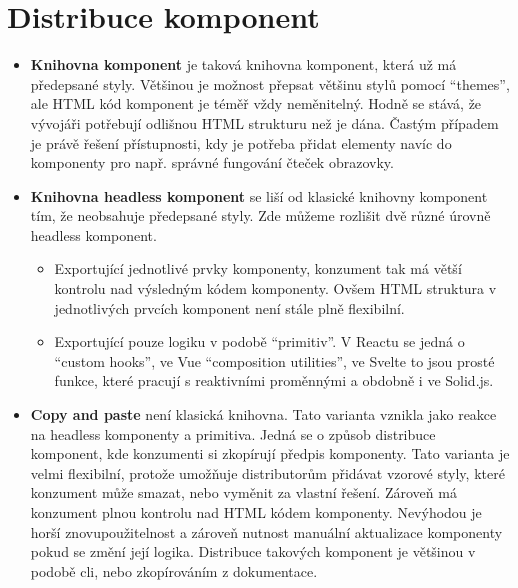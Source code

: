 \section{Distribuce komponent}

\begin{itemize}
      \item \textbf{Knihovna komponent} je taková knihovna komponent, která už má předepsané styly. Většinou je možnost přepsat většinu stylů pomocí ``themes'', ale HTML kód komponent je téměř vždy neměnitelný.
            Hodně se stává, že vývojáři potřebují odlišnou HTML strukturu než je dána.
            Častým případem je právě řešení přístupnosti, kdy je potřeba přidat elementy navíc do komponenty pro např. správné fungování čteček obrazovky.
      \item \textbf{Knihovna headless komponent} se liší od klasické knihovny komponent tím, že neobsahuje předepsané styly.
            Zde můžeme rozlišit dvě různé úrovně headless komponent.
            \begin{itemize}
                  \item Exportující jednotlivé prvky komponenty, konzument tak má větší kontrolu nad výsledným kódem komponenty.
                        Ovšem HTML struktura v jednotlivých prvcích komponent není stále plně flexibilní.
                  \item Exportující pouze logiku v podobě ``primitiv''. V Reactu se jedná o ``custom hooks'', ve Vue ``composition utilities'', ve Svelte to jsou prosté funkce, které pracují s reaktivními proměnnými a obdobně i ve Solid.js.
            \end{itemize}
      \item \textbf{Copy and paste} není klasická knihovna.
            Tato varianta vznikla jako reakce na headless komponenty a primitiva.
            Jedná se o způsob distribuce komponent, kde konzumenti si zkopírují předpis komponenty.
            Tato varianta je velmi flexibilní, protože umožňuje distributorům přidávat vzorové styly, které konzument může smazat, nebo vyměnit za vlastní řešení.
            Zároveň má konzument plnou kontrolu nad HTML kódem komponenty.
            Nevýhodou je horší znovupoužitelnost a zároveň nutnost manuální aktualizace komponenty pokud se změní její logika.
            Distribuce takových komponent je většinou v podobě \gls{cli}, nebo zkopírováním z dokumentace.
\end{itemize}

\clearpage

